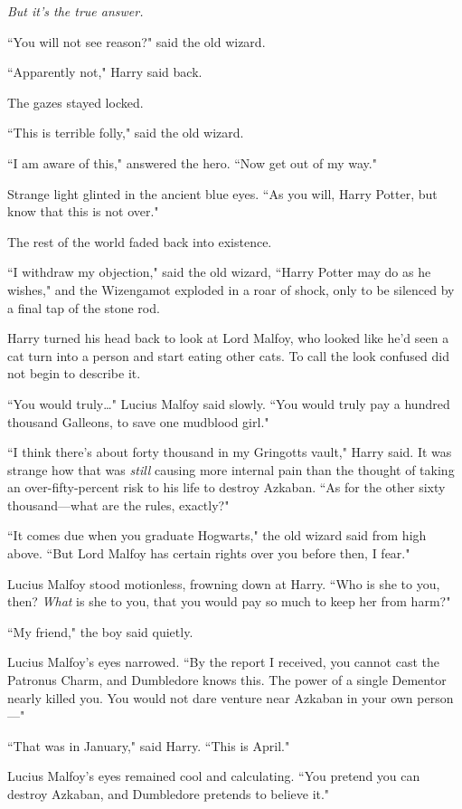 \emph{But it's the true answer.}

``You will not see reason?" said the old wizard.

``Apparently not," Harry said back.

The gazes stayed locked.

``This is terrible folly," said the old wizard.

``I am aware of this," answered the hero. ``Now get out of my way."

Strange light glinted in the ancient blue eyes. ``As you will, Harry Potter, but know that this is not over."

The rest of the world faded back into existence.

``I withdraw my objection," said the old wizard, ``Harry Potter may do as he wishes," and the Wizengamot exploded in a roar of shock, only to be silenced by a final tap of the stone rod.

Harry turned his head back to look at Lord Malfoy, who looked like he'd seen a cat turn into a person and start eating other cats. To call the look confused did not begin to describe it.

``You would truly{\ldots}" Lucius Malfoy said slowly. ``You would truly pay a hundred thousand Galleons, to save one mudblood girl."

``I think there's about forty thousand in my Gringotts vault," Harry said. It was strange how that was \emph{still} causing more internal pain than the thought of taking an over-fifty-percent risk to his life to destroy Azkaban. ``As for the other sixty thousand—what are the rules, exactly?"

``It comes due when you graduate Hogwarts," the old wizard said from high above. ``But Lord Malfoy has certain rights over you before then, I fear."

Lucius Malfoy stood motionless, frowning down at Harry. ``Who is she to you, then? \emph{What} is she to you, that you would pay so much to keep her from harm?"

``My friend," the boy said quietly.

Lucius Malfoy's eyes narrowed. ``By the report I received, you cannot cast the Patronus Charm, and Dumbledore knows this. The power of a single Dementor nearly killed you. You would not dare venture near Azkaban in your own person—"

``That was in January," said Harry. ``This is April."

Lucius Malfoy's eyes remained cool and calculating. ``You pretend you can destroy Azkaban, and Dumbledore pretends to believe it."

